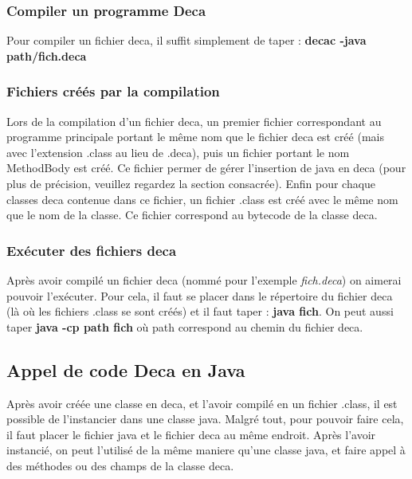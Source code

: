 \documentclass[12pt, a4paper, one side]{article}
\begin{document}
    \subsubsection{Compiler un programme Deca}

    Pour compiler un fichier deca, il suffit simplement de taper : \newline
    \textbf{decac -java path/fich.deca}

    \subsubsection{Fichiers créés par la compilation}

    Lors de la compilation d'un fichier deca, un premier fichier correspondant
    au programme principale portant le même nom que le fichier deca est créé (mais
    avec l'extension .class au lieu de .deca), puis un fichier portant le nom
    MethodBody est créé. Ce fichier permer de gérer l'insertion de java en deca
    (pour plus de précision, veuillez regardez la section consacrée). Enfin pour
    chaque classes deca contenue dans ce fichier, un fichier .class est créé avec
    le même nom que le nom de la classe. Ce fichier correspond au bytecode de la
    classe deca.

    \subsubsection{Exécuter des fichiers deca}

    Après avoir compilé un fichier deca (nommé pour l'exemple \textit{fich.deca})
    on aimerai pouvoir l'exécuter. Pour cela, il faut se placer dans le répertoire
    du fichier deca (là où les fichiers .class se sont créés) et il faut taper :
    \newline \textbf{java fich}. On peut aussi taper \textbf{java -cp path fich} où path correspond au chemin du fichier deca.

    \subsection{Appel de code Deca en Java}

    Après avoir créée une classe en deca, et l'avoir compilé en un fichier .class,
    il est possible de l'instancier dans une classe java. Malgré tout, pour pouvoir
    faire cela, il faut placer le fichier java et le fichier deca au même endroit.
    Après l'avoir instancié, on peut l'utilisé de la même maniere qu'une classe
    java, et faire appel à des méthodes ou des champs de la classe deca.
\end{document}
